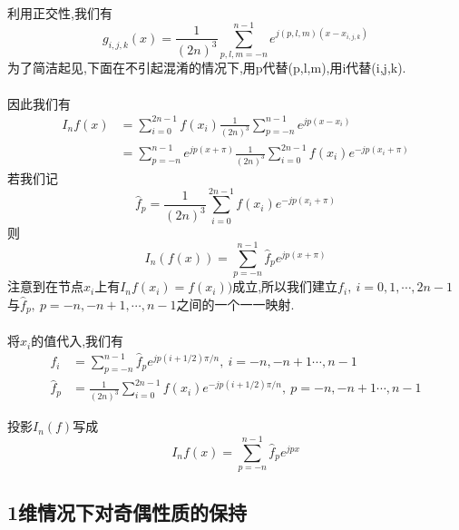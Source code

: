 \documentclass[UTF8]{ctexart}
\begin{document}
\paragraph{}
利用正交性,我们有
$$
g_{i,j,k}(x) = \frac{1}{(2n)^3} \sum\limits_{p,l,m=-n}^{n-1}e^{j(p,l,m)(x-x_{i,j,k})}
$$
为了简洁起见,下面在不引起混淆的情况下,用p代替(p,l,m),用i代替(i,j,k).
\paragraph{}
因此我们有
\begin{equation}
 \begin{split}
 I_{n}f(x) &= \sum\limits_{i=0}^{2n-1}f(x_{i})\frac{1}{(2n)^3} \sum\limits_{p=-n}^{n-1}e^{jp(x-x_i)}     \\
   &= \sum\limits_{p=-n}^{n-1}e^{jp(x+\pi)} \frac{1}{(2n)^3} \sum\limits_{i=0}^{2n-1}f(x_{i})e^{-jp(x_i+\pi)}
 \end{split}
\end{equation}
若我们记
$$
\hat{f}_p = \frac{1}{(2n)^3} \sum\limits_{i=0}^{2n-1}f(x_{i})e^{-jp(x_i+\pi)}
$$
则
$$
I_n(f(x)) =  \sum\limits_{p=-n}^{n-1}\hat{f}_p e^{jp(x+\pi)}
$$
注意到在节点$x_{i}$上有$I_nf(x_i)=f(x_i))$成立,所以我们建立$f_i,\ i=0,1,\cdots,2n-1$与$\hat{f}_p,\ p=-n,-n+1,\cdots,n-1$之间的一个一一映射.
\paragraph{}
将$x_i$的值代入,我们有
\begin{equation}
 \begin{split}
 f_i &= \sum\limits_{p=-n}^{n-1}\hat{f}_p e^{jp(i+1/2)\pi/n}   ,\ i=-n,-n+1\cdots,n-1  \\
  \hat{f}_p &= \frac{1}{(2n)^3} \sum\limits_{i=0}^{2n-1}f(x_{i})e^{-jp(i+1/2)\pi/n} ,\ p=-n,-n+1\cdots,n-1
 \end{split}
\end{equation}

投影$I_n(f)$写成
$$
I_nf(x) =  \sum\limits_{p=-n}^{n-1}\hat{f}_p e^{jpx}
$$



\subsection{1维情况下对奇偶性质的保持}
\end{document}

